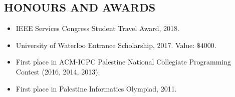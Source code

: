       \subsection*{HONOURS AND AWARDS  }
	\begin{itemize}
    \item IEEE Services Congress Student Travel Award, 2018.
    
    \item University of Waterloo Entrance Scholarship, 2017. Value: $\$4000$.
	\item First place in ACM-ICPC Palestine National Collegiate Programming Contest (2016, 2014, 2013).
    \item First place in Palestine Informatics Olympiad, 2011.    
	\end{itemize}